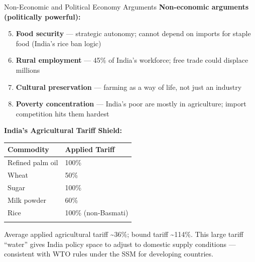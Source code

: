 \documentclass[
  ignorenonframetext,
  aspectratio=169,
]{beamer}
\makeatletter
\providecommand{\tightlist}{%
  \setlength{\itemsep}{0pt}\setlength{\parskip}{0pt}}
\let\quarto@originallabel\label
\DeclareRobustCommand*{\label}[1]{\quarto@originallabel{#1}}
\makeatother
\begin{document}
\begin{frame}{Non-Economic and Political Economy Arguments}
\label{non-economic-and-political-economy-arguments}
\textbf{Non-economic arguments (politically powerful):}

\begin{enumerate}
\setcounter{enumi}{4}
\tightlist
\item
  \textbf{Food security} --- strategic autonomy; cannot depend on
  imports for staple food (India's rice ban logic)
\item
  \textbf{Rural employment} --- 45\% of India's workforce; free trade
  could displace millions
\item
  \textbf{Cultural preservation} --- farming as a way of life, not just
  an industry
\item
  \textbf{Poverty concentration} --- India's poor are mostly in
  agriculture; import competition hits them hardest
\end{enumerate}

\textbf{India's Agricultural Tariff Shield:}

\begin{longtable}[]{@{}ll@{}}
\toprule\noalign{}
Commodity & Applied Tariff \\
\midrule\noalign{}
\endhead
Refined palm oil & 100\% \\
Wheat & 50\% \\
Sugar & 100\% \\
Milk powder & 60\% \\
Rice & 100\% (non-Basmati) \\
\bottomrule\noalign{}
\end{longtable}

Average applied agricultural tariff \textasciitilde36\%; bound tariff
\textasciitilde114\%. This large tariff ``water'' gives India policy
space to adjust to domestic supply conditions --- consistent with WTO
rules under the SSM for developing countries.
\end{frame}
\end{document}
